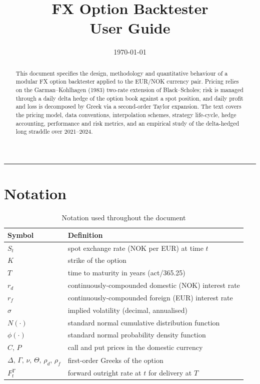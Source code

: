 \documentclass[11pt, a4paper]{article}
\title{%
    \Large\bfseries FX Option Backtester\\[0.4em]
    \large User Guide
}
\author{}
\date{\today}
\theoremstyle{defstyle}
\begin{document}

\maketitle

\begin{abstract}
\noindent
This document specifies the design, methodology and quantitative behaviour of a
modular FX option backtester applied to the EUR/NOK currency pair.
Pricing relies on the Garman--Kohlhagen (1983) two-rate extension of Black--Scholes;
risk is managed through a daily delta hedge of the option book against a spot
position, and daily profit and loss is decomposed by Greek via a second-order
Taylor expansion.
The text covers the pricing model, data conventions, interpolation schemes,
strategy life-cycle, hedge accounting, performance and risk metrics, and an
empirical study of the delta-hedged long straddle over 2021--2024.
\end{abstract}

\tableofcontents
\bigskip

\hrule
\vspace{1em}

\section*{Notation}

\begin{table}[H]
\centering
\renewcommand{\arraystretch}{1.25}
\begin{tabular}{@{} l l @{}}
    \toprule
    \textbf{Symbol} & \textbf{Definition} \\
    \midrule
    $S_t$       & spot exchange rate (NOK per EUR) at time $t$ \\
    $K$         & strike of the option \\
    $T$         & time to maturity in years (act/365.25) \\
    $r_d$       & continuously-compounded domestic (NOK) interest rate \\
    $r_f$       & continuously-compounded foreign (EUR) interest rate \\
    $\sigma$    & implied volatility (decimal, annualised) \\
    $N(\cdot)$  & standard normal cumulative distribution function \\
    $\phi(\cdot)$ & standard normal probability density function \\
    $C,\,P$     & call and put prices in the domestic currency \\
    $\Delta,\,\Gamma,\,\nu,\,\Theta,\,\rho_d,\,\rho_f$ & first-order Greeks of the option \\
    $F_t^{T}$   & forward outright rate at $t$ for delivery at $T$ \\
    \bottomrule
\end{tabular}
\caption{Notation used throughout the document}
\end{table}
\end{document}
